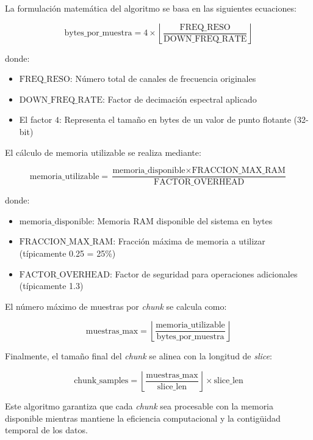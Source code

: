 La formulación matemática del algoritmo se basa en las siguientes ecuaciones:

\[
\text{bytes\_por\_muestra} = 4 \times \left\lfloor \frac{\text{FREQ\_RESO}}{\text{DOWN\_FREQ\_RATE}} \right\rfloor
\]

donde:
\begin{itemize}
    \item $\text{FREQ\_RESO}$: Número total de canales de frecuencia originales
    \item $\text{DOWN\_FREQ\_RATE}$: Factor de decimación espectral aplicado
    \item El factor $4$: Representa el tamaño en bytes de un valor de punto flotante (32-bit)
\end{itemize}

El cálculo de memoria utilizable se realiza mediante:

\[
\text{memoria\_utilizable} = \frac{\text{memoria\_disponible} \times \text{FRACCION\_MAX\_RAM}}{\text{FACTOR\_OVERHEAD}}
\]

donde:
\begin{itemize}
    \item $\text{memoria\_disponible}$: Memoria RAM disponible del sistema en bytes
    \item $\text{FRACCION\_MAX\_RAM}$: Fracción máxima de memoria a utilizar (típicamente 0.25 = 25\%)
    \item $\text{FACTOR\_OVERHEAD}$: Factor de seguridad para operaciones adicionales (típicamente 1.3)
\end{itemize}

El número máximo de muestras por \emph{chunk} se calcula como:

\[
\text{muestras\_max} = \left\lfloor \frac{\text{memoria\_utilizable}}{\text{bytes\_por\_muestra}} \right\rfloor
\]

Finalmente, el tamaño final del \emph{chunk} se alinea con la longitud de \emph{slice}:

\[
\text{chunk\_samples} = \left\lfloor \frac{\text{muestras\_max}}{\text{slice\_len}} \right\rfloor \times \text{slice\_len}
\]

Este algoritmo garantiza que cada \emph{chunk} sea procesable con la memoria disponible mientras mantiene la eficiencia computacional y la contigüidad temporal de los datos.

